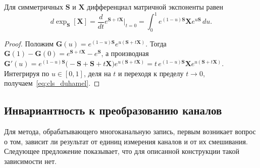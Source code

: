 \begin{lemma}\label{lem:cls_duhamel}
Для симметричных $\mathbf{S}$ и $\mathbf{X}$ дифференциал матричной экспоненты равен
\begin{equation}\label{eq:cls_duhamel}
d\exp_{\mathbf{S}}[\mathbf{X}] = \frac{d}{dt} e^{\mathbf{S} + t\mathbf{X}} \Big|_{t=0} = \int_{0}^{1} e^{(1-u)\mathbf{S}} \mathbf{X} e^{u\mathbf{S}} \, du .
\end{equation}
\end{lemma}
\begin{proof}
Положим $\mathbf{G}(u) = e^{(1-u)\mathbf{S}} e^{u(\mathbf{S}+t\mathbf{X})}$. Тогда $\mathbf{G}(1) - \mathbf{G}(0) = e^{\mathbf{S}+t\mathbf{X}} - e^{\mathbf{S}}$, а производная
$\mathbf{G}'(u) = e^{(1-u)\mathbf{S}} \big( -\mathbf{S} + \mathbf{S} + t\mathbf{X} \big) e^{u(\mathbf{S}+t\mathbf{X})} = t\, e^{(1-u)\mathbf{S}} \mathbf{X} e^{u(\mathbf{S}+t\mathbf{X})}$.
Интегрируя по $u \in [0,1]$, деля на $t$ и переходя к пределу $t \to 0$, получаем~\eqref{eq:cls_duhamel}.
\end{proof}

\subsection{Инвариантность к преобразованию каналов}\label{sec3:cls_theory_inv}

Для метода, обрабатывающего многоканальную запись, первым возникает вопрос о том, зависит ли результат от единиц измерения каналов и от их смешивания. Следующее предложение показывает, что для описанной конструкции такой зависимости нет.

